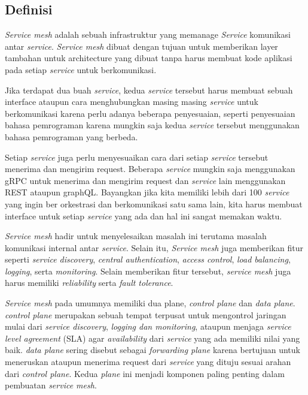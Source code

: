 \subsection{Definisi}

\textit{Service mesh} adalah sebuah infrastruktur yang memanage \textit{Service} komunikasi antar \textit{service}. \textit{Service mesh} dibuat dengan tujuan untuk memberikan layer tambahan untuk architecture yang dibuat tanpa harus membuat kode aplikasi pada setiap \textit{service} untuk berkomunikasi.\parencite{li2019} 

Jika terdapat dua buah \textit{service}, kedua \textit{service} tersebut harus membuat sebuah interface ataupun cara menghubungkan masing masing \textit{service} untuk berkomunikasi karena perlu adanya beberapa penyesuaian, seperti penyesuaian bahasa pemrograman karena mungkin saja kedua \textit{service} tersebut menggunakan bahasa pemrograman yang berbeda. 

Setiap \textit{service} juga perlu menyesuaikan cara dari setiap \textit{service} tersebut menerima dan mengirim request. Beberapa \textit{service} mungkin saja menggunakan gRPC untuk menerima dan mengirim request dan \textit{service} lain menggunakan REST ataupun graphQL. Bayangkan jika kita memiliki lebih dari 100 \textit{service} yang ingin ber orkestrasi dan berkomunikasi satu sama lain, kita harus membuat interface untuk setiap \textit{service} yang ada dan hal ini sangat memakan waktu.

\textit{Service mesh} hadir untuk menyelesaikan masalah ini terutama masalah komunikasi internal antar \textit{service}. Selain itu, \textit{Service mesh} juga memberikan fitur seperti \textit{service discovery}, \textit{central authentication}, \textit{access control}, \textit{load balancing}, \textit{logging}, serta \textit{monitoring}. Selain memberikan fitur tersebut, \textit{\textit{service} mesh} juga harus memiliki \textit{reliability} serta \textit{fault tolerance}. \parencite{li2019} 

\textit{Service mesh} pada umumnya memiliki dua plane, \textit{control plane} dan \textit{data plane}. \textit{control plane} merupakan sebuah tempat terpusat untuk mengontrol jaringan mulai dari \textit{service discovery}, \textit{logging dan monitoring}, ataupun menjaga \textit{service level agreement} (SLA) agar \textit{availability} dari \textit{service} yang ada memiliki nilai yang baik. \textit{data plane} sering disebut sebagai \textit{forwarding plane} karena bertujuan untuk meneruskan ataupun menerima request dari \textit{service} yang dituju sesuai arahan dari \textit{control plane}. Kedua \textit{plane} ini menjadi komponen paling penting dalam pembuatan \textit{\textit{service} mesh}.


